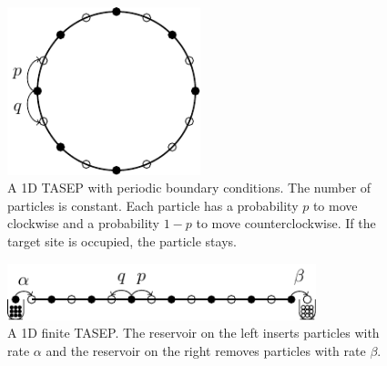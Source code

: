 \begin{figure}[h]
    \centering
    \includegraphics[width=0.5\textwidth]{tasep_a.pdf}
    \caption{A 1D TASEP with periodic boundary conditions. The number of particles is constant. Each particle has a probability $p$ to move clockwise and a probability $1-p$ to move counterclockwise. If the target site is occupied, the particle stays.}
    \label{fig:tasep_1d_periodic}
\end{figure}

\begin{figure}[h]
    \centering
    \includegraphics[width=0.8\textwidth]{tasep_b.pdf}
    \caption{A 1D finite TASEP. The reservoir on the left inserts particles with rate $\alpha$ and the reservoir on the right removes particles with rate $\beta$.}
    \label{fig:tasep_1d_finite}
\end{figure}



